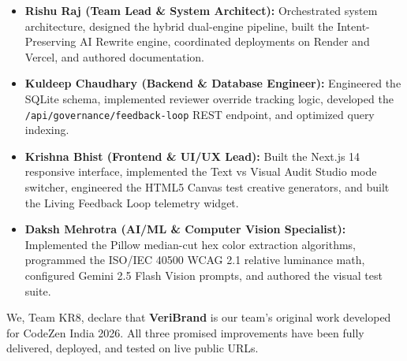 \documentclass[11pt,a4paper]{article}
\begin{document}
\begin{itemize}[leftmargin=1cm]
    \item \textbf{Rishu Raj (Team Lead \& System Architect):}
    Orchestrated system architecture, designed the hybrid dual-engine pipeline, built the Intent-Preserving AI Rewrite engine, coordinated deployments on Render and Vercel, and authored documentation.
    \item \textbf{Kuldeep Chaudhary (Backend \& Database Engineer):}
    Engineered the SQLite schema, implemented reviewer override tracking logic, developed the \texttt{/api/governance/feedback-loop} REST endpoint, and optimized query indexing.
    \item \textbf{Krishna Bhist (Frontend \& UI/UX Lead):}
    Built the Next.js 14 responsive interface, implemented the Text vs Visual Audit Studio mode switcher, engineered the HTML5 Canvas test creative generators, and built the Living Feedback Loop telemetry widget.
    \item \textbf{Daksh Mehrotra (AI/ML \& Computer Vision Specialist):}
    Implemented the Pillow median-cut hex color extraction algorithms, programmed the ISO/IEC 40500 WCAG 2.1 relative luminance math, configured Gemini 2.5 Flash Vision prompts, and authored the visual test suite.
\end{itemize}

\vspace{1cm}
\begin{tcolorbox}[colback=successgreen!10, colframe=successgreen, title=\textbf{Final Round 3 Declaration}]
We, Team KR8, declare that \textbf{VeriBrand} is our team's original work developed for CodeZen India 2026. All three promised improvements have been fully delivered, deployed, and tested on live public URLs.
\end{tcolorbox}
\end{document}
